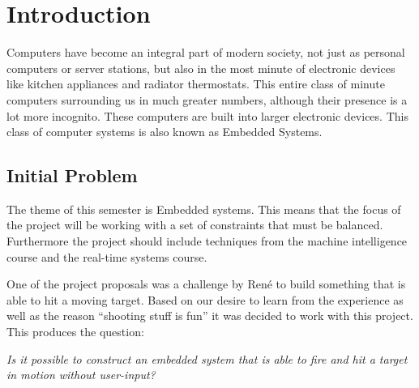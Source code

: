 \chapter{Introduction}
Computers have become an integral part of modern society, not just as personal
computers or server stations, but also in the most minute of electronic devices
like kitchen appliances and radiator thermostats. This entire class of minute
computers surrounding us in much greater numbers, although their presence is a
lot more incognito. These computers are built into larger electronic devices.
This class of computer systems is also known as Embedded Systems.


\section{Initial Problem}
The theme of this semester is Embedded systems. This means that the focus of
the project will be working with a set of constraints that must be balanced.
Furthermore the project should include techniques from the machine intelligence
course and the real-time systems course.\nl

One of the project proposals was a challenge by Ren\'e to build something that
is able to hit a moving target. Based on our desire to learn from the experience
as well as the reason ``shooting stuff is fun'' it was decided
to work with this project. This produces the question:\nl

\textit{Is it possible to construct an embedded system that is able to fire and hit
a target in motion without user-input?}
